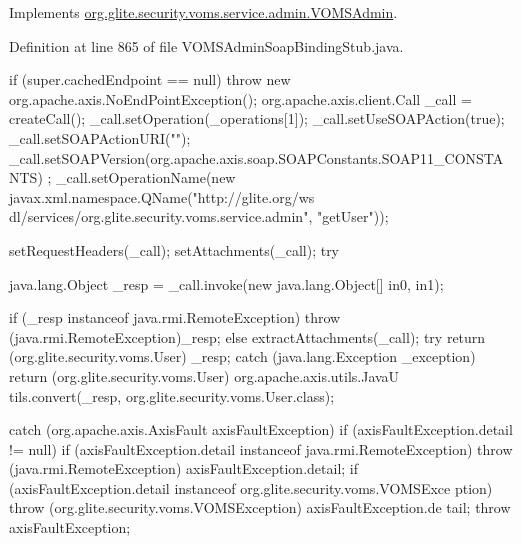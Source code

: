Implements \hyperlink{interfaceorg_1_1glite_1_1security_1_1voms_1_1service_1_1admin_1_1VOMSAdmin_a539d9d88122edfeae1cb2d658528ea1d}{org.glite.security.voms.service.admin.VOMSAdmin}.



Definition at line 865 of file VOMSAdminSoapBindingStub.java.


\begin{DoxyCode}
                                                                                 
                                                                                       
       {
        if (super.cachedEndpoint == null) {
            throw new org.apache.axis.NoEndPointException();
        }
        org.apache.axis.client.Call _call = createCall();
        _call.setOperation(_operations[1]);
        _call.setUseSOAPAction(true);
        _call.setSOAPActionURI("");
        _call.setSOAPVersion(org.apache.axis.soap.SOAPConstants.SOAP11_CONSTANTS)
      ;
        _call.setOperationName(new javax.xml.namespace.QName("http://glite.org/ws
      dl/services/org.glite.security.voms.service.admin", "getUser"));

        setRequestHeaders(_call);
        setAttachments(_call);
 try {        java.lang.Object _resp = _call.invoke(new java.lang.Object[] {in0, 
      in1});

        if (_resp instanceof java.rmi.RemoteException) {
            throw (java.rmi.RemoteException)_resp;
        }
        else {
            extractAttachments(_call);
            try {
                return (org.glite.security.voms.User) _resp;
            } catch (java.lang.Exception _exception) {
                return (org.glite.security.voms.User) org.apache.axis.utils.JavaU
      tils.convert(_resp, org.glite.security.voms.User.class);
            }
        }
  } catch (org.apache.axis.AxisFault axisFaultException) {
    if (axisFaultException.detail != null) {
        if (axisFaultException.detail instanceof java.rmi.RemoteException) {
              throw (java.rmi.RemoteException) axisFaultException.detail;
         }
        if (axisFaultException.detail instanceof org.glite.security.voms.VOMSExce
      ption) {
              throw (org.glite.security.voms.VOMSException) axisFaultException.de
      tail;
         }
   }
  throw axisFaultException;
}
    }
\end{DoxyCode}
